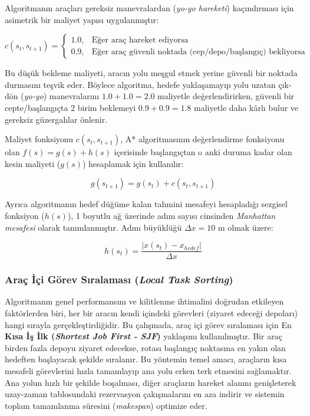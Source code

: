 Algoritmanın araçları gereksiz manevralardan (\textit{yo-yo hareketi}) kaçındırması için asimetrik bir maliyet yapısı uygulanmıştır:

\begin{equation}
    c(s_t, s_{t+1}) = \begin{cases} 1.0, & \text{Eğer araç hareket ediyorsa} \\ 0.9, & \text{Eğer araç güvenli noktada (cep/depo/başlangıç) bekliyorsa} \end{cases}
\end{equation}

Bu düşük bekleme maliyeti, aracın yolu meşgul etmek yerine güvenli bir noktada durmasını teşvik eder. Böylece algoritma, hedefe yaklaşamayıp yolu uzatan çık-dön (\textit{yo-yo}) manevralarını $1.0 + 1.0 = 2.0$ maliyetle değerlendirirken, güvenli bir cepte/başlangıçta 2 birim beklemeyi $0.9 + 0.9 = 1.8$ maliyetle daha kârlı bulur ve gereksiz güzergahlar önlenir.

Maliyet fonksiyonu $c(s_t, s_{t+1})$, A* algoritmasının değerlendirme fonksiyonu olan $f(s) = g(s) + h(s)$ içerisinde başlangıçtan o anki duruma kadar olan kesin maliyeti ($g(s)$) hesaplamak için kullanılır:

\begin{equation}
    g(s_{t+1}) = g(s_t) + c(s_t, s_{t+1})
\end{equation}

Ayrıca algoritmanın hedef düğüme kalan tahmini mesafeyi hesapladığı sezgisel fonksiyon ($h(s)$), 1 boyutlu ağ üzerinde adım sayısı cinsinden \textit{Manhattan mesafesi} olarak tanımlanmıştır. Adım büyüklüğü $\Delta x = 10$ m olmak üzere:

\begin{equation}
    h(s_t) = \frac{|x(s_t) - x_{hedef}|}{\Delta x}
\end{equation}


\subsubsection{Araç İçi Görev Sıralaması (\textit{Local Task Sorting})} \label{sec:araç-içi-görev-sıralaması}

Algoritmanın genel performansını ve kilitlenme ihtimalini doğrudan etkileyen faktörlerden biri, her bir aracın kendi içindeki görevleri (ziyaret edeceği depoları) hangi sırayla gerçekleştirdiğidir. Bu çalışmada, araç içi görev sıralaması için En \textbf{Kısa İş İlk (\textit{Shortest Job First - SJF})} yaklaşımı kullanılmıştır. Bir araç birden fazla depoyu ziyaret edecekse, rotası başlangıç noktasına en yakın olan hedeften başlayacak şekilde sıralanır. Bu yöntemin temel amacı, araçların kısa mesafeli görevlerini hızla tamamlayıp ana yolu erken terk etmesini sağlamaktır. Ana yolun hızlı bir şekilde boşalması, diğer araçların hareket alanını genişleterek uzay-zaman tablosundaki rezervasyon çakışmalarını en aza indirir ve sistemin toplam tamamlanma süresini (\textit{makespan}) optimize eder.

